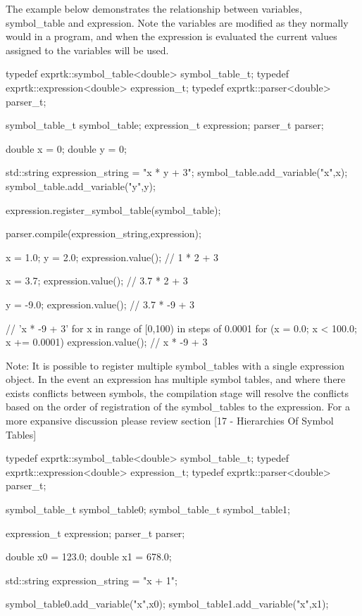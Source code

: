 The  example  below demonstrates  the  relationship between variables,
symbol\_table and expression. Note  the variables are modified  as they
normally would in a program, and when the expression is  evaluated the
current values assigned to the variables will be used.

typedef exprtk::symbol\_table<double> symbol\_table\_t;
typedef exprtk::expression<double>     expression\_t;
typedef exprtk::parser<double>             parser\_t;

symbol\_table\_t symbol\_table;
expression\_t   expression;
parser\_t       parser;

double x = 0;
double y = 0;

std::string expression\_string = "x * y + 3";
symbol\_table.add\_variable("x",x);
symbol\_table.add\_variable("y",y);

expression.register\_symbol\_table(symbol\_table);

parser.compile(expression\_string,expression);

x = 1.0;
y = 2.0;
expression.value(); // 1 * 2 + 3

x = 3.7;
expression.value(); // 3.7 * 2 + 3

y = -9.0;
expression.value(); // 3.7 * -9 + 3

// 'x * -9 + 3' for x in range of [0,100) in steps of 0.0001
for (x = 0.0; x < 100.0; x += 0.0001)
{
expression.value(); // x * -9 + 3
}


Note: It is possible to register multiple symbol\_tables with a  single
expression  object. In  the event  an expression  has multiple  symbol
tables,  and  where  there  exists  conflicts  between  symbols,   the
compilation stage  will resolve  the conflicts  based on  the order of
registration  of  the  symbol\_tables to  the  expression.  For a  more
expansive  discussion  please  review section  [17  -  Hierarchies  Of
Symbol Tables]

typedef exprtk::symbol\_table<double> symbol\_table\_t;
typedef exprtk::expression<double>     expression\_t;
typedef exprtk::parser<double>             parser\_t;

symbol\_table\_t symbol\_table0;
symbol\_table\_t symbol\_table1;

expression\_t   expression;
parser\_t       parser;

double x0 = 123.0;
double x1 = 678.0;

std::string expression\_string = "x + 1";

symbol\_table0.add\_variable("x",x0);
symbol\_table1.add\_variable("x",x1);

